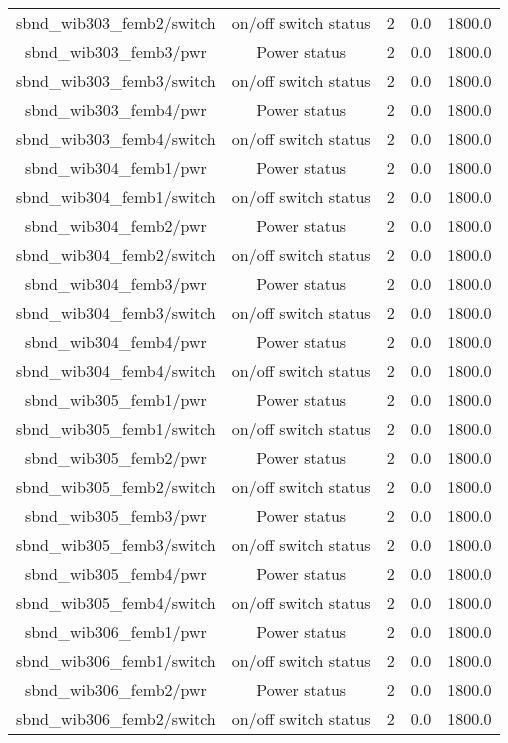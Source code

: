 \begin{center}
\begin{longtable}{c | c c c c }
sbnd\_wib303\_femb2/switch & on/off switch status & 2 & 0.0 & 1800.0\\ 
sbnd\_wib303\_femb3/pwr & Power status & 2 & 0.0 & 1800.0\\ 
sbnd\_wib303\_femb3/switch & on/off switch status & 2 & 0.0 & 1800.0\\ 
sbnd\_wib303\_femb4/pwr & Power status & 2 & 0.0 & 1800.0\\ 
sbnd\_wib303\_femb4/switch & on/off switch status & 2 & 0.0 & 1800.0\\ 
sbnd\_wib304\_femb1/pwr & Power status & 2 & 0.0 & 1800.0\\ 
sbnd\_wib304\_femb1/switch & on/off switch status & 2 & 0.0 & 1800.0\\ 
sbnd\_wib304\_femb2/pwr & Power status & 2 & 0.0 & 1800.0\\ 
sbnd\_wib304\_femb2/switch & on/off switch status & 2 & 0.0 & 1800.0\\ 
sbnd\_wib304\_femb3/pwr & Power status & 2 & 0.0 & 1800.0\\ 
sbnd\_wib304\_femb3/switch & on/off switch status & 2 & 0.0 & 1800.0\\ 
sbnd\_wib304\_femb4/pwr & Power status & 2 & 0.0 & 1800.0\\ 
sbnd\_wib304\_femb4/switch & on/off switch status & 2 & 0.0 & 1800.0\\ 
sbnd\_wib305\_femb1/pwr & Power status & 2 & 0.0 & 1800.0\\ 
sbnd\_wib305\_femb1/switch & on/off switch status & 2 & 0.0 & 1800.0\\ 
sbnd\_wib305\_femb2/pwr & Power status & 2 & 0.0 & 1800.0\\ 
sbnd\_wib305\_femb2/switch & on/off switch status & 2 & 0.0 & 1800.0\\ 
sbnd\_wib305\_femb3/pwr & Power status & 2 & 0.0 & 1800.0\\ 
sbnd\_wib305\_femb3/switch & on/off switch status & 2 & 0.0 & 1800.0\\ 
sbnd\_wib305\_femb4/pwr & Power status & 2 & 0.0 & 1800.0\\ 
sbnd\_wib305\_femb4/switch & on/off switch status & 2 & 0.0 & 1800.0\\ 
sbnd\_wib306\_femb1/pwr & Power status & 2 & 0.0 & 1800.0\\ 
sbnd\_wib306\_femb1/switch & on/off switch status & 2 & 0.0 & 1800.0\\ 
sbnd\_wib306\_femb2/pwr & Power status & 2 & 0.0 & 1800.0\\ 
sbnd\_wib306\_femb2/switch & on/off switch status & 2 & 0.0 & 1800.0\\ 

\end{longtable}
\end{center}
